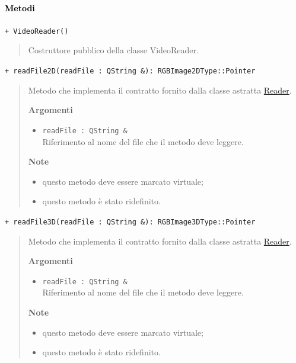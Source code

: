 \paragraph{\textcolor{black}{Metodi\\}}
\color{blue}\verb!+ VideoReader()!
\begin{quote}
\color{black}Costruttore pubblico della classe VideoReader. \\
\end{quote}
\color{blue}\verb!+ readFile2D(readFile : QString &): RGBImage2DType::Pointer!
\begin{quote}
\color{black} Metodo che implementa il contratto fornito dalla classe astratta \hyperref[spereader]{Reader}.

\textbf{Argomenti}
\begin{itemize}
\item \verb!readFile : QString &! \\ Riferimento al nome del file che il metodo deve leggere.
\end{itemize}

\textbf{Note}
\begin{itemize}
\item questo metodo deve essere marcato virtuale;
\item questo metodo è stato ridefinito.
\end{itemize}
\end{quote} 
\color{blue}\verb!+ readFile3D(readFile : QString &): RGBImage3DType::Pointer!
\begin{quote}
\color{black} Metodo che implementa il contratto fornito dalla classe astratta \hyperref[spereader]{Reader}.

\textbf{Argomenti}
\begin{itemize}
\item \verb!readFile : QString &! \\ Riferimento al nome del file che il metodo deve leggere.
\end{itemize}

\textbf{Note}
\begin{itemize}
\item questo metodo deve essere marcato virtuale;
\item questo metodo è stato ridefinito.
\end{itemize}
\end{quote} 
\color{black}


